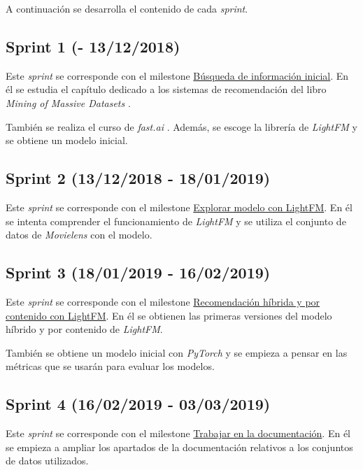 A continuación se desarrolla el contenido de cada \textit{sprint}.

\subsection{Sprint 1 (- 13/12/2018)}\label{sprint-1}
Este \textit{sprint} se corresponde con el milestone \href{https://github.com/rnc0011/SistemaRecomendacionTFG/milestone/1}{Búsqueda de información inicial}. En él se estudia el capítulo dedicado a los sistemas de recomendación del libro \textit{Mining of Massive Datasets} \cite{miningDatasets}.

También se realiza el curso de \textit{fast.ai} \cite{fastai}. Además, se escoge la librería de \textit{LightFM} y se obtiene un modelo inicial.

\subsection{Sprint 2 (13/12/2018 - 18/01/2019)}\label{sprint-2}
Este \textit{sprint} se corresponde con el milestone \href{https://github.com/rnc0011/SistemaRecomendacionTFG/milestone/3}{Explorar modelo con LightFM}. En él se intenta comprender el funcionamiento de \textit{LightFM} y se utiliza el conjunto de datos de \textit{Movielens} con el modelo.

\subsection{Sprint 3 (18/01/2019 - 16/02/2019)}\label{sprint-3}
Este \textit{sprint} se corresponde con el milestone \href{https://github.com/rnc0011/SistemaRecomendacionTFG/milestone/4}{Recomendación híbrida y por contenido con LightFM}. En él se obtienen las primeras versiones del modelo híbrido y por contenido de \textit{LightFM}. 

También se obtiene un modelo inicial con \textit{PyTorch} y se empieza a pensar en las métricas que se usarán para evaluar los modelos.

\subsection{Sprint 4 (16/02/2019 - 03/03/2019)}\label{sprint-4}
Este \textit{sprint} se corresponde con el milestone \href{https://github.com/rnc0011/SistemaRecomendacionTFG/milestone/5}{Trabajar en la documentación}. En él se empieza a ampliar los apartados de la documentación relativos a los conjuntos de datos utilizados.

